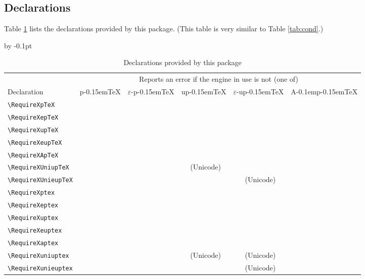 \documentclass[a4paper]{article}
\newcommand\pTeX{p\kern-0.15em\TeX}
\newcommand\e{\ensuremath{\varepsilon}}
\newcommand\epTeX{\e-\pTeX}
\newcommand\upTeX{u\pTeX}
\newcommand\eupTeX{\e-\upTeX}
\newcommand\ApTeX{A\kern-0.1em\pTeX}
\newcommand\yes{\checkmark}
\newcommand\UNI{(Unicode)}
\newcommand\uni{{\footnotesize\UNI}}
\begin{document}
\subsection{Declarations}

Table \ref{tab:decl} lists the declarations provided by this package. (This
table is very similar to Table \ref{tab:cond}.)
\vskip-10pt\relax
\begin{table}[!ht]\centering\advance\tabcolsep by -0.1pt\relax
\caption{Declarations provided by this package}
\label{tab:decl}
\begin{tabular}{lccccc}
\toprule
                          & \multicolumn{5}{c}{Reports an error if the engine in
                              use is not (one of)}                            \\
                            \cmidrule(lr){2-6}
Declaration               & \pTeX & \epTeX & \upTeX     & \eupTeX    & \ApTeX \\
\midrule
\verb|\RequireXpTeX|      & \yes  &        &            &            &        \\
\verb|\RequireXepTeX|     &       & \yes   &            &            &        \\
\verb|\RequireXupTeX|     &       &        & \yes       &            &        \\
\verb|\RequireXeupTeX|    &       &        &            & \yes       &        \\
\verb|\RequireXApTeX|     &       &        &            &            & \yes   \\
\verb|\RequireXUniupTeX|  &       &        & \yes\ \uni &            &        \\
\verb|\RequireXUnieupTeX| &       &        &            & \yes\ \uni &        \\
\verb|\RequireXptex|      & \yes  & \yes   & \yes       & \yes       & \yes   \\
\verb|\RequireXeptex|     &       & \yes   &            & \yes       &        \\
\verb|\RequireXuptex|     &       &        & \yes       & \yes       & \yes   \\
\verb|\RequireXeuptex|    &       &        &            & \yes       &        \\
\verb|\RequireXaptex|     &       &        &            &            & \yes   \\
\verb|\RequireXuniuptex|  &       &        & \yes\ \uni & \yes\ \uni & \yes   \\
\verb|\RequireXunieuptex| &       &        &            & \yes\ \uni &        \\
\bottomrule
\end{tabular}
\end{table}
\end{document}
